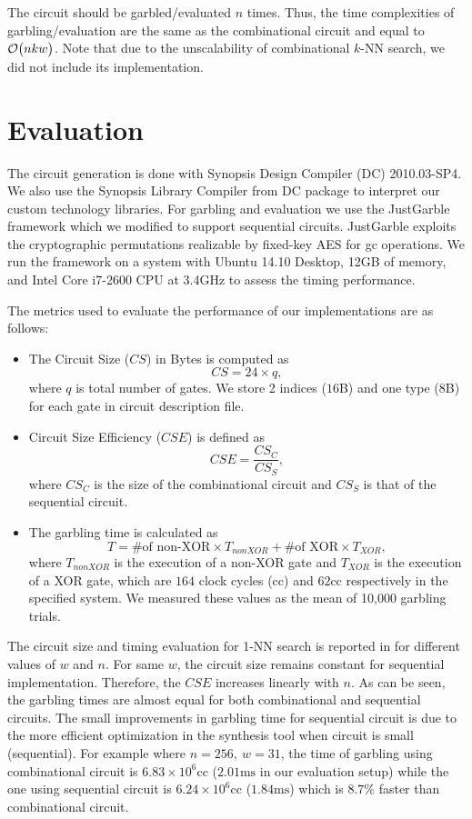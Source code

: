 The circuit should be garbled/evaluated $n$ times.
Thus, the time complexities of garbling/evaluation are the same as the combinational circuit and equal to $\mathcal{O}\bigl(nkw\bigr)$.
Note that due to the unscalability of combinational $k$-NN search, we did not include its implementation.

\section{Evaluation}\label{sec:knn-eval}
The circuit generation is done with Synopsis Design Compiler (DC) 2010.03-SP4.
We also use the Synopsis Library Compiler from DC package to interpret our custom technology libraries.
For garbling and evaluation we use the JustGarble framework \cite{bellare2013efficient} which we modified to support sequential circuits.
JustGarble exploits the cryptographic permutations realizable by fixed-key AES for \acrshort{gc} operations.
We run the framework on a system with Ubuntu 14.10 Desktop, 12GB of memory, and Intel Core i7-2600 CPU at 3.4GHz to assess the timing performance.

The metrics used to evaluate the performance of our implementations are as follows:
\begin{itemize}
  \item The Circuit Size ($\mathit{CS}$) in Bytes is computed as $$\mathit{CS} = 24\times q, $$ where $q$ is total number of gates.
We store 2 indices ($16$B) and one type ($8$B) for each gate in circuit description file.

  \item Circuit Size Efficiency ($\mathit{CSE}$) is defined as $$\mathit{CSE} = \dfrac{\mathit{CS}_{C}}{\mathit{CS}_{S}}, $$ where $\mathit{CS}_{C}$ is the size of the combinational circuit and $\mathit{CS}_{S}$ is that of the sequential circuit.

  \item The garbling time is calculated as $$\mathit{T} = \text{\# of non-XOR} \times \mathit{T_{nonXOR}} + \text{\# of XOR} \times \mathit{T_\text{XOR}},$$ where $\mathit{T_{nonXOR}}$ is the execution of a non-XOR gate and $\mathit{T_\text{XOR}}$ is the execution of a XOR gate, which are $164$ clock cycles (cc) and $62$cc respectively in the specified system.
We measured these values as the mean of 10,000 garbling trials.
\end{itemize}

The circuit size and timing evaluation for 1-NN search is reported in  for different values of $w$ and $n$.
For same $w$, the circuit size remains constant for sequential implementation.
Therefore, the $\mathit{CSE}$ increases linearly with $n$.
As can be seen, the garbling times are almost equal for both combinational and sequential circuits.
The small improvements in garbling time for sequential circuit is due to the more efficient optimization in the synthesis tool when circuit is small (sequential).
For example where $n=256,~w=31$, the time of garbling using combinational circuit is $6.83\times 10^6\text{cc}$ ($2.01\text{ms}$ in our evaluation setup) while the one using sequential circuit is $6.24\times 10^6\text{cc}$ ($1.84\text{ms}$) which is $8.7\%$ faster than combinational circuit.

